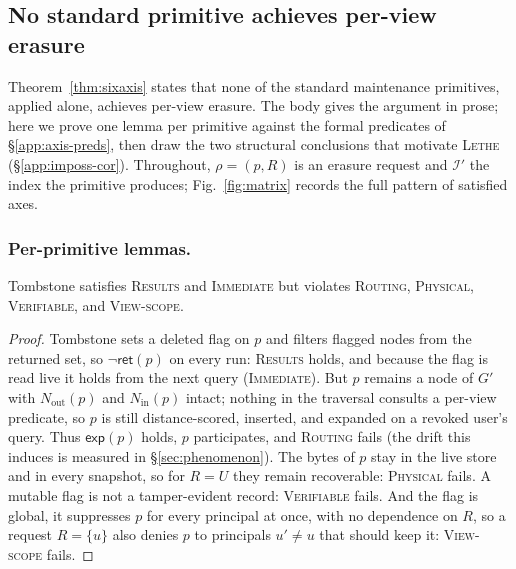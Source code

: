 \documentclass[sigconf, nonacm, review]{acmart}
\newcommand{\Nout}{N_{\mathrm{out}}}
\newcommand{\Nin}{N_{\mathrm{in}}}
\begin{document}
\subsection{No standard primitive achieves per-view erasure}
\label{app:imposs}

Theorem~\ref{thm:sixaxis} states that none of the standard maintenance
primitives, applied alone, achieves per-view erasure. The body gives the
argument in prose; here we prove one lemma per primitive against the formal
predicates of \S\ref{app:axis-preds}, then draw the two structural
conclusions that motivate \textsc{Lethe} (\S\ref{app:imposs-cor}). Throughout,
$\rho=(p,R)$ is an erasure request and $\mathcal{I}'$ the index the primitive
produces; Fig.~\ref{fig:matrix} records the full pattern of satisfied axes.

\subsubsection{Per-primitive lemmas.}
\label{app:imposs-lemmas}

\begin{lemma}[Tombstone]
\label{lem:tombstone}
Tombstone satisfies \textsc{Results} and \textsc{Immediate} but violates
\textsc{Routing}, \textsc{Physical}, \textsc{Verifiable}, and
\textsc{View-scope}.
\end{lemma}
\begin{proof}
Tombstone sets a deleted flag on $p$ and filters flagged nodes from the
returned set, so $\lnot\mathsf{ret}(p)$ on every run: \textsc{Results} holds,
and because the flag is read live it holds from the next query
(\textsc{Immediate}). But $p$ remains a node of $G'$ with $\Nout(p)$ and
$\Nin(p)$ intact; nothing in the traversal consults a per-view predicate, so
$p$ is still distance-scored, inserted, and expanded on a revoked user's
query. Thus $\mathsf{exp}(p)$ holds, $p$ participates, and \textsc{Routing}
fails (the drift this induces is measured in \S\ref{sec:phenomenon}). The
bytes of $p$ stay in the live store and in every snapshot, so for $R=U$ they
remain recoverable: \textsc{Physical} fails. A mutable flag is not a
tamper-evident record: \textsc{Verifiable} fails. And the flag is global, it suppresses $p$ for every principal at once, with no dependence on $R$, so a request $R=\{u\}$ also denies $p$ to principals $u'\neq u$ that should
keep it: \textsc{View-scope} fails.
\end{proof}
\end{document}

